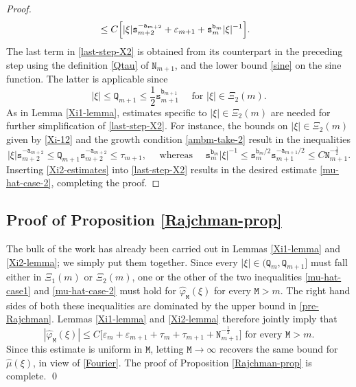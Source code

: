 \documentclass[12pt, twoside]{article}
\theoremstyle{definition}
\numberwithin{equation}{section}
\begin{document}
\begin{proof}
\begin{align}
&\leq C \Bigl[ |\xi| \mathtt s_{m+2}^{-\mathtt a_{m+2}} + \varepsilon_{m+1} + \mathtt s_{m}^{\mathtt b_{m}} |\xi|^{-1} \Bigr]. \label{last-step-X2} 
\end{align} 
The last term in \eqref{last-step-X2} is obtained from its counterpart in the preceding step using the definition \eqref{Qtau} of $\mathtt N_{m+1}$, and the lower bound \eqref{sine} on the sine function.  The latter is applicable since 
\[ |\xi| \leq \mathtt Q_{m+1} \leq \frac{1}{2}\mathtt s_{m+1}^{\mathtt b_{m+1}} \quad \text{ for }  |\xi| \in \Xi_2(m). \]   
\vskip0.1in
\noindent As in Lemma \ref{Xi1-lemma}, estimates specific to $|\xi| \in \Xi_2(m)$ are needed for further simplification of \eqref{last-step-X2}. For instance, the bounds on $|\xi| \in  \Xi_2(m)$ given by \eqref{Xi-12} and the growth condition \eqref{ambm-take-2} result in the inequalities 
\begin{equation} \label{Xi2-estimates} |\xi| \mathtt s_{m+2}^{-\mathtt a_{m+2}} \leq \mathtt Q_{m+1} \mathtt s_{m+2}^{-\mathtt a_{m+2}} \leq \tau_{m+1}, \quad \text{ whereas } \quad \mathtt s_{m}^{\mathtt b_{m}} |\xi|^{-1} \leq \mathtt s_{m}^{\mathtt b_{m}/2} \mathtt s_{m+1}^{-\mathtt a_{m+1}/2} \leq C \mathtt N_{m+1}^{-\frac{1}{2}}. 
\end{equation}    
Inserting \eqref{Xi2-estimates} into \eqref{last-step-X2} results in the desired estimate \eqref{mu-hat-case-2}, completing the proof.   
\end{proof} 
\subsection{Proof of Proposition \ref{Rajchman-prop}}    
The bulk of the work has already been carried out in Lemmas \ref{Xi1-lemma} and \ref{Xi2-lemma}; we simply put them together. Since every $|\xi| \in (\mathtt Q_m, \mathtt Q_{m+1}]$ must fall either in $\Xi_1(m)$ or $\Xi_2(m)$, one or the other of the two inequalities \eqref{mu-hat-case1} and \eqref{mu-hat-case-2} must hold for $\widehat{\varphi}_{\mathtt M}(\xi)$ for every $\mathtt M > m$. The right hand sides of both these inequalities are dominated by  the upper bound in \eqref{pre-Rajchman}. Lemmas \ref{Xi1-lemma} and \ref{Xi2-lemma} therefore jointly imply that 
\[ |\widehat{\varphi}_{\mathtt M}(\xi)| \leq C \bigl[ \varepsilon_m + \varepsilon_{m+1} + \tau_m + \tau_{m+1} + \mathtt N_{m+1}^{-\frac{1}{2}}\bigr] \text{ for every $\mathtt M > m$.} \]  Since this estimate is uniform in $\mathtt M$, letting $\mathtt M \rightarrow \infty$ recovers the same bound for $\widehat{\mu}(\xi)$, in view of \eqref{Fourier}. The proof of Proposition \ref{Rajchman-prop} is complete.  
\qed
\end{document}
